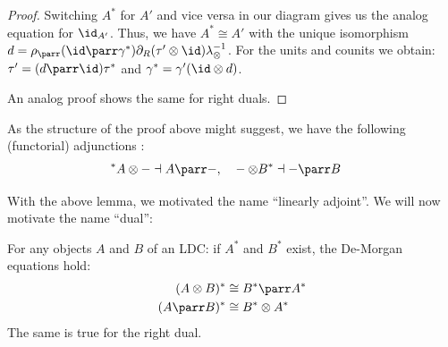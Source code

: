 \documentclass[DIN, pagenumber=false, fontsize=11pt, parskip=half, colorinlistoftodos, svgnames]{scrartcl}
\begin{document}
\begin{proof}
		Switching $A^*$ for $A'$ and vice versa in our diagram gives us the analog equation for $\id_{A'}$. 
		Thus, we have $A^* \cong A'$ with the unique isomorphism 
		$d = \rho_\parr (\id \parr \gamma^*) \partial_R (\tau' \otimes \id) \lambda_\otimes^{-1}$. 
		For the units and counits we obtain: 
		$\tau' = (d \parr \id) \tau^*$ and $\gamma^* = \gamma' (\id \otimes d)$.
		
		An analog proof shows the same for right duals.
	\end{proof}
	
	
	\begin{remark}
		As the structure of the proof above might suggest, we have the following (functorial) adjunctions \cite[Lemma 4.2]{cockett&seely97}:
		\begin{align*}
			{^*A} \otimes - \dashv A \parr - , 
			&\quad
			- \otimes B^* \dashv - \parr B
		\end{align*}
	\end{remark}
	
	With the above lemma, we motivated the name “linearly adjoint”. We will now motivate the name “dual”:
	
	\begin{lemma}
		\label{lemma: deMorgan}
		For any objects $A$ and $B$ of an LDC: if $A^*$ and $B^*$ exist, the De-Morgan equations hold:
		\begin{align*}
			(A \otimes B)^* & \cong B^* \parr A^* 
			\\
			(A \parr B)^* & \cong B^* \otimes A^*
		\end{align*}
		The same is true for the right dual.
	\end{lemma}
	
\end{document}
